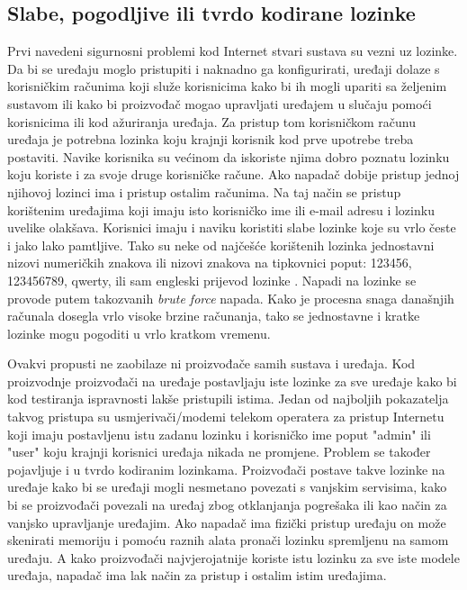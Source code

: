\documentclass[times, utf8, diplomski]{fer}
\begin{document}
\subsection{Slabe, pogodljive ili tvrdo kodirane lozinke}
Prvi navedeni sigurnosni problemi kod Internet stvari sustava su vezni uz lozinke. Da bi se uređaju moglo pristupiti i naknadno ga konfigurirati, uređaji dolaze s korisničkim računima koji služe korisnicima kako bi ih mogli upariti sa željenim sustavom ili kako bi proizvođač mogao upravljati uređajem u slučaju pomoći korisnicima ili kod ažuriranja uređaja. Za pristup tom korisničkom računu uređaja je potrebna lozinka koju krajnji korisnik kod prve upotrebe treba postaviti. Navike korisnika su većinom da iskoriste njima dobro poznatu lozinku koju koriste i za svoje druge korisničke račune. Ako napadač dobije pristup jednoj njihovoj lozinci ima i pristup ostalim računima. Na taj način se pristup korištenim uređajima koji imaju isto korisničko ime ili e-mail adresu i lozinku uvelike olakšava. Korisnici imaju i naviku koristiti slabe lozinke koje su vrlo česte i jako lako pamtljive. Tako su neke od najčešće korištenih lozinka jednostavni nizovi numeričkih znakova ili nizovi znakova na tipkovnici poput: 123456, 123456789, qwerty, ili sam engleski prijevod lozinke \citep{pass1}. Napadi na lozinke se provode putem takozvanih \emph{brute force} napada. Kako je procesna snaga današnjih računala dosegla vrlo visoke brzine računanja, tako se jednostavne i kratke lozinke mogu pogoditi u vrlo kratkom vremenu.

Ovakvi propusti ne zaobilaze ni proizvođače samih sustava i uređaja. Kod proizvodnje proizvođači na uređaje postavljaju iste lozinke za sve uređaje kako bi kod testiranja ispravnosti lakše pristupili istima. Jedan od najboljih pokazatelja takvog pristupa su usmjerivači/modemi telekom operatera za pristup Internetu koji imaju postavljenu istu zadanu lozinku i korisničko ime poput "admin" ili "user" koju krajnji korisnici uređaja nikada ne promjene. Problem se također pojavljuje i u tvrdo kodiranim  lozinkama. Proizvođači postave takve lozinke na uređaje kako bi se uređaji mogli nesmetano povezati s vanjskim servisima, kako bi se proizvođači povezali na uređaj zbog otklanjanja pogrešaka ili kao način za vanjsko upravljanje uređajim. Ako napadač ima fizički pristup uređaju on može skenirati memoriju i pomoću raznih alata pronači lozinku spremljenu na samom uređaju. A kako proizvođači najvjerojatnije koriste istu lozinku za sve iste modele uređaja, napadač ima lak način za pristup i ostalim istim uređajima.
\end{document}
